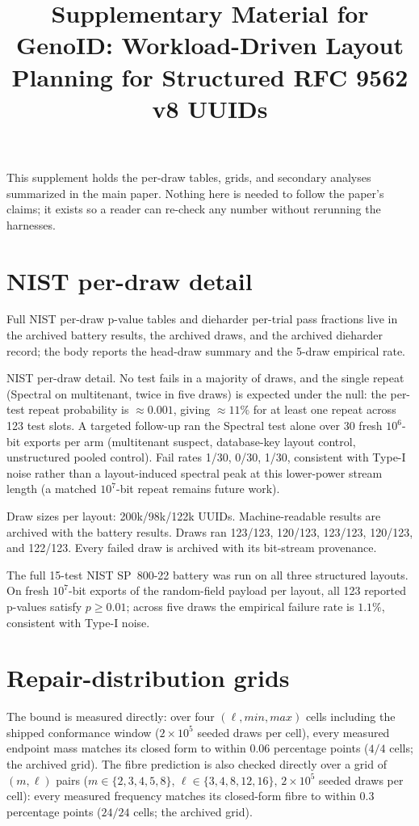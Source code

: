 \documentclass[11pt]{article}
\title{Supplementary Material for GenoID: Workload-Driven Layout Planning for Structured RFC 9562 v8 UUIDs}
\author{}
\date{}
\begin{document}
\maketitle
This supplement holds the per-draw tables, grids, and secondary analyses summarized in the main paper. Nothing here is needed to follow the paper's claims; it exists so a reader can re-check any number without rerunning the harnesses.

\section{NIST per-draw detail}
Full NIST per-draw p-value tables and dieharder per-trial pass fractions live in the archived battery results, the archived draws, and the archived dieharder record; the body reports the head-draw summary and the 5-draw empirical rate.

NIST per-draw detail. No test fails in a majority of draws, and the single repeat (Spectral on multitenant, twice in five draws) is expected under the null: the per-test repeat probability is $\approx 0.001$, giving $\approx 11\%$ for at least one repeat across 123 test slots. A targeted follow-up ran the Spectral test alone over 30 fresh $10^6$-bit exports per arm (multitenant suspect, database-key layout control, unstructured pooled control). Fail rates 1/30, 0/30, 1/30, consistent with Type-I noise rather than a layout-induced spectral peak at this lower-power stream length (a matched $10^7$-bit repeat remains future work).

Draw sizes per layout: 200k/98k/122k UUIDs. Machine-readable results are archived with the battery results. Draws ran 123/123, 120/123, 123/123, 120/123, and 122/123. Every failed draw is archived with its bit-stream provenance.

The full 15-test NIST SP~800-22 battery was run on all three structured layouts. On fresh $10^7$-bit exports of the random-field payload per layout, all 123 reported p-values satisfy $p \geq 0.01$; across five draws the empirical failure rate is $1.1\%$, consistent with Type-I noise.

\section{Repair-distribution grids}
The bound is measured directly: over four $(\ell,\textit{min},\textit{max})$ cells including the shipped conformance window ($2\times10^5$ seeded draws per cell), every measured endpoint mass matches its closed form to within $0.06$ percentage points ($4/4$ cells; the archived grid). The fibre prediction is also checked directly over a grid of $(m,\ell)$ pairs ($m \in \{2,3,4,5,8\}$, $\ell \in \{3,4,8,12,16\}$, $2\times10^5$ seeded draws per cell): every measured frequency matches its closed-form fibre to within $0.3$ percentage points ($24/24$ cells; the archived grid).
\end{document}
